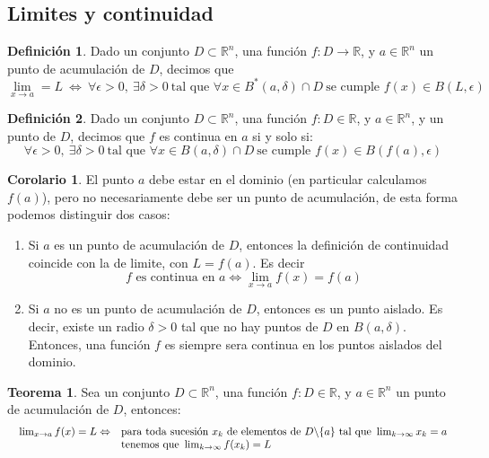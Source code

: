 \documentclass[10pt]{article}
\theoremstyle{definition}
\newtheorem{definition}{Definición}[section]
\newtheorem{theorem}{Teorema}[section]
\newtheorem{corollary}{Corolario}[theorem]
\begin{document}
\subsection{Limites y continuidad}
\begin{definition}
    Dado un conjunto $D\subset\mathbb{R}^n$, una función $f:D\to\mathbb{R}$, y $a\in\mathbb{R}^n$ un punto de acumulación de $D$, decimos que $$\lim_{x \to a}=L\ \Leftrightarrow\ \forall\epsilon>0,\ \exists\delta>0\ \text{tal que }\forall x\in B^*(a,\delta)\cap D\ \text{se cumple }f(x)\in B(L,\epsilon)$$
\end{definition}
\begin{definition}
    Dado un conjunto $D\subset\mathbb{R}^n$, una función $f:D\in\mathbb{R}$, y $a\in\mathbb{R}^n$, y un punto de $D$, decimos que $f$ es continua en $a$ si y solo si: $$\forall\epsilon>0,\ \exists\delta>0\ \text{tal que }\forall x\in B(a,\delta)\cap D\ \text{se cumple }f(x)\in B(f(a),\epsilon)$$
\end{definition}
\begin{corollary}
    El punto $a$ debe estar en el dominio (en particular calculamos $f(a)$), pero no necesariamente debe ser un punto de acumulación, de esta forma podemos distinguir dos casos:
    \begin{enumerate}
        \item Si $a$ es un punto de acumulación de $D$, entonces la definición de continuidad coincide con la de limite, con $L=f(a)$. Es decir $$f\text{ es continua en }a\Leftrightarrow \lim_{x \to a}f(x)=f(a)$$
        \item Si $a$ no es un punto de acumulación de $D$, entonces es un punto aislado. Es decir, existe un radio $\delta>0$ tal que no hay puntos de $D$ en $B(a,\delta)$. Entonces, una función $f$ es siempre sera continua en los puntos aislados del dominio.
    \end{enumerate}
\end{corollary}
\begin{theorem}
    Sea un conjunto $D\subset\mathbb{R}^n$, una función $f:D\in\mathbb{R}$, y $a\in\mathbb{R}^n$ un punto de acumulación de $D$, entonces: $$ \begin{array}{l}
\begin{array}{ c l }
\lim _{x\rightarrow a} f( x) =L\Leftrightarrow  & \text{para toda sucesión } x_{k} \ \text{de elementos de } D\backslash \{a\} \ \text{tal que }\lim _{k\rightarrow \infty } x_{k} =a\\
 & \text{tenemos que }\lim _{k\rightarrow \infty } f( x_{k}) =L
\end{array}\\
\end{array}$$
\end{theorem}
\end{document}
